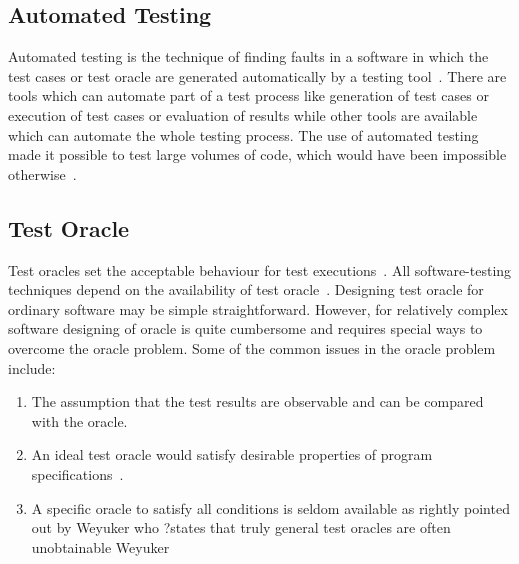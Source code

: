 {\subsection{Automated Testing}
Automated testing is the technique of finding faults in a software in which the test cases or test oracle are generated automatically by a testing tool~\cite{Leitner2007}. There are tools which can automate part of a test process like generation of test cases or execution of test cases or evaluation of results while other tools are available which can automate the whole testing process. The use of automated testing made it possible to test large volumes of code, which would have been impossible otherwise~\cite{ramamoorthy1975}.

\subsection{Test Oracle}
Test oracles set the acceptable behaviour for test executions~\cite{baresi2001test}. All software-testing techniques depend on the availability of test oracle~\cite{gaudel2010software}. Designing test oracle for ordinary software may be simple straightforward. However, for relatively complex software designing of oracle is quite cumbersome and requires special ways to overcome the oracle problem. Some of the common issues in the oracle problem include:
\begin{enumerate}
\item The assumption that the test results are observable and can be compared with the oracle.
\item An ideal test oracle would satisfy desirable properties of program specifications~\cite{baresi2001test}.
\item A specific oracle to satisfy all conditions is seldom available as rightly pointed out by Weyuker who ?states that truly general test oracles are often unobtainable Weyuker~\cite{weyuker1982testing} 
\end{enumerate}



}
